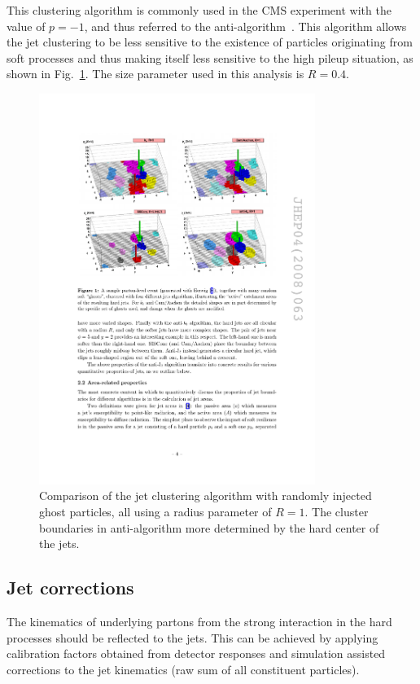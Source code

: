 This clustering algorithm is commonly used in the CMS experiment with the value of $p=-1$, and thus referred to the anti-\kt algorithm~\cite{CMS:antikt}.
This algorithm allows the jet clustering to be less sensitive to the existence of particles originating from soft processes and thus making itself less sensitive to the high pileup situation, as shown in Fig.~\ref{fig:reco_antikt.png}.
The size parameter used in this analysis is $R=0.4$.
\begin{figure}\centering
    \includegraphics[width=0.8\textwidth]{figure/reco_antikt.pdf}
    \caption[Comparison of the jet clustering algorithm.]
    {
        Comparison of the jet clustering algorithm with randomly injected ghost particles, all using a radius parameter of $R=1$.
        The cluster boundaries in anti-\kt algorithm more determined by the hard center of the jets.
    }
    \label{fig:reco_antikt.png}
\end{figure}

\subsection{Jet corrections}
The kinematics of underlying partons from the strong interaction in the hard processes should be reflected to the jets.
This can be achieved by applying calibration factors obtained from detector responses and simulation assisted corrections to the jet kinematics (raw sum of all constituent particles).

